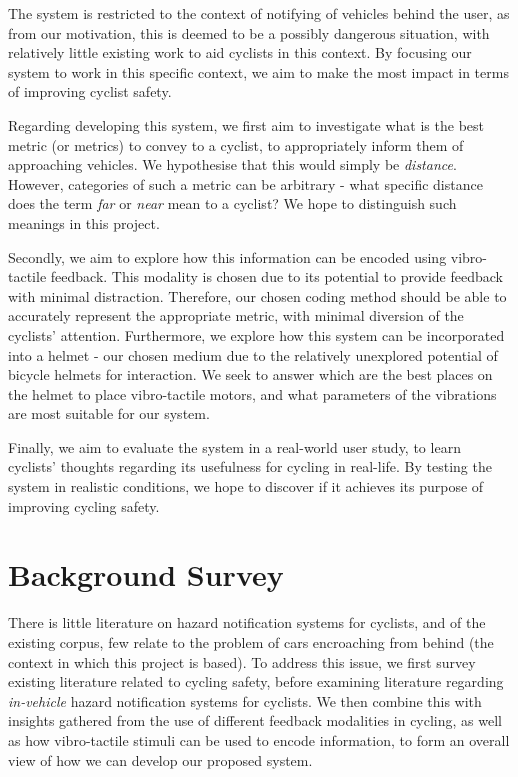 \documentclass{interim}
\begin{document}
The system is restricted to the context of notifying of vehicles behind the user, as from our motivation, this is deemed to be a possibly dangerous situation, with relatively little existing work to aid cyclists in this context. By focusing our system to work in this specific context, we aim to make the most impact in terms of improving cyclist safety.

Regarding developing this system, we first aim to investigate what is the best metric (or metrics) to convey to a cyclist, to appropriately inform them of approaching vehicles. We hypothesise that this would simply be \textit{distance}. However, categories of such a metric can be arbitrary - what specific distance does the term \textit{far} or \textit{near} mean to a cyclist? We hope to distinguish such meanings in this project.

Secondly, we aim to explore how this information can be encoded using vibro-tactile feedback. This modality is chosen due to its potential to provide feedback with minimal distraction. Therefore, our chosen coding method should be able to accurately represent the appropriate metric, with minimal diversion of the cyclists' attention. Furthermore, we explore how this system can be incorporated into a helmet - our chosen medium due to the relatively unexplored potential of bicycle helmets for interaction. We seek to answer which are the best places on the helmet to place vibro-tactile motors, and what parameters of the vibrations are most suitable for our system.

Finally, we aim to evaluate the system in a real-world user study, to learn cyclists' thoughts regarding its usefulness for cycling in real-life. By testing the system in realistic conditions, we hope to discover if it achieves its purpose of improving cycling safety.


\section{Background Survey}
There is little literature on hazard notification systems for cyclists, and of the existing corpus, few relate to the problem of cars encroaching from behind (the context in which this project is based). To address this issue, we first survey existing literature related to cycling safety, before examining literature regarding \textit{in-vehicle} hazard notification systems for cyclists. We then combine this with insights gathered from the use of different feedback modalities in cycling, as well as how vibro-tactile stimuli can be used to encode information, to form an overall view of how we can develop our proposed system.
\end{document}
